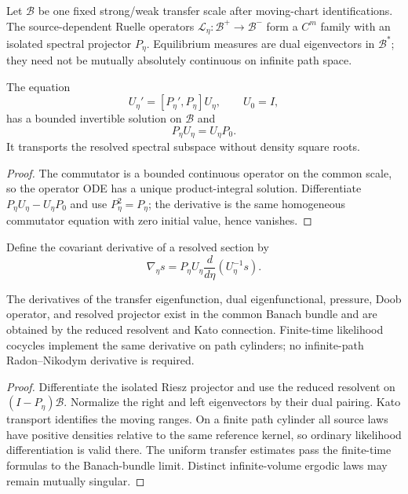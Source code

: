 Let $\mathscr B$ be one fixed strong/weak transfer scale after moving-chart
identifications.  The source-dependent Ruelle operators
$\mathcal L_\eta:\mathscr B^+\to\mathscr B^-$ form a $C^m$ family with an
isolated spectral projector $P_\eta$.  Equilibrium measures are dual
eigenvectors in $\mathscr B^*$; they need not be mutually absolutely
continuous on infinite path space.

\begin{lemma}
\label{lem:r8-c2-kato}
The equation
\[
 U_\eta'=[P_\eta',P_\eta]U_\eta,
 \qquad U_0=I,
\]
has a bounded invertible solution on $\mathscr B$ and
\[
 P_\eta U_\eta=U_\eta P_0.
\]
It transports the resolved spectral subspace without density square roots.
\end{lemma}

\begin{proof}
The commutator is a bounded continuous operator on the common scale, so the
operator ODE has a unique product-integral solution.  Differentiate
$P_\eta U_\eta-U_\eta P_0$ and use $P_\eta^2=P_\eta$; the derivative is the
same homogeneous commutator equation with zero initial value, hence vanishes.
\end{proof}

Define the covariant derivative of a resolved section by
\[
 \nabla_\eta s=P_\eta U_\eta
 \frac d{d\eta}(U_\eta^{-1}s).
\]

\begin{theorem}
\label{thm:r8-c2-doob}
The derivatives of the transfer eigenfunction, dual eigenfunctional, pressure,
Doob operator, and resolved projector exist in the common Banach bundle and are
obtained by the reduced resolvent and Kato connection.  Finite-time likelihood
cocycles implement the same derivative on path cylinders; no infinite-path
Radon--Nikodym derivative is required.
\end{theorem}

\begin{proof}
Differentiate the isolated Riesz projector and use the reduced resolvent on
$(I-P_\eta)\mathscr B$.  Normalize the right and left eigenvectors by their
dual pairing.  Kato transport identifies the moving ranges.  On a finite path
cylinder all source laws have positive densities relative to the same reference
kernel, so ordinary likelihood differentiation is valid there.  The uniform
transfer estimates pass the finite-time formulas to the Banach-bundle limit.
Distinct infinite-volume ergodic laws may remain mutually singular.
\end{proof}

